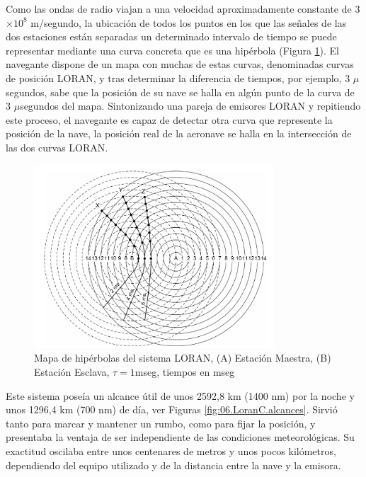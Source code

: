 Como las ondas de radio viajan a una velocidad aproximadamente constante de 3$ \times 10^8$ m/segundo, la ubicaci\'on de todos los puntos en los que las se\~nales de las dos estaciones est\'an separadas un determinado intervalo de tiempo se puede representar mediante una curva concreta que es una hip\'erbola (Figura \ref{fig:LORAN_hiperbolas}). El navegante dispone de un mapa con muchas de estas curvas, denominadas curvas de posici\'on LORAN, y tras determinar la diferencia de tiempos, por ejemplo, 3 $\mu$segundos, sabe que la posici\'on de su nave se halla en alg\'un punto de la curva de 3 $\mu$segundos del mapa. Sintonizando una pareja de emisores LORAN y repitiendo este proceso, el navegante es capaz de detectar otra curva que represente la posici\'on de la nave, la posici\'on real de la aeronave se halla en la intersecci\'on de las dos curvas LORAN. 


\begin{figure}[!h]
  \centering
  \includegraphics[width=0.8\textwidth ]{06.radionavegacion/Imagenes/06.01.Loran/06_Loran_intersecciones.png}
  \caption{Mapa de hip\'erbolas del sistema LORAN, (A) Estación Maestra, (B) Estación Esclava, $\tau=1$mseg, tiempos en mseg \protect\cite{tooley2017aircraft}}
  \label{fig:LORAN_hiperbolas}
\end{figure}


Este sistema pose\'ia un alcance \'util de unos 2592,8 km (1400 nm) por la noche y unos 1296,4 km (700 nm) de d\'ia,
ver Figuras \ref{fig:06.LoranC.alcances}. 
Sirvi\'o tanto para marcar y mantener un rumbo, como para fijar la posici\'on, y presentaba la ventaja de ser independiente de las condiciones meteorol\'ogicas. Su exactitud oscilaba entre unos centenares de metros y unos pocos kil\'ometros, dependiendo del equipo utilizado y de la distancia entre la nave y la emisora. 

